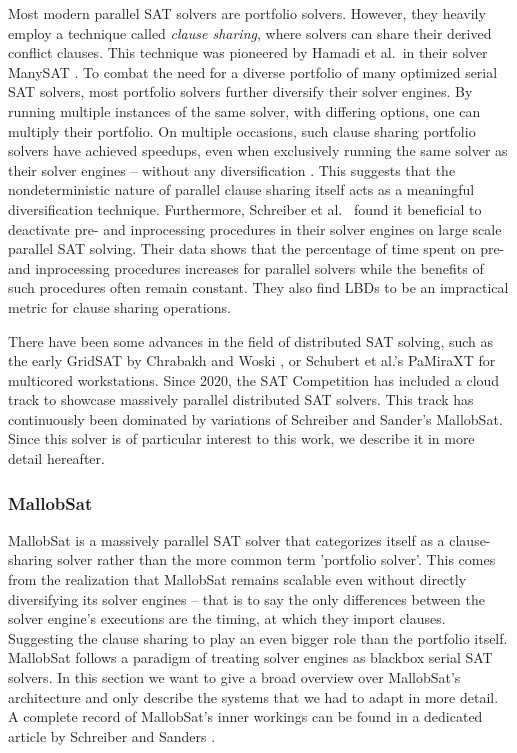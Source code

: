 \documentclass[12pt,a4paper,twoside]{scrartcl}
\numberwithin{equation}{section}
\begin{document}
Most modern parallel SAT solvers are portfolio solvers. However, they heavily employ a technique called \textit{clause sharing}, where solvers can share their derived conflict clauses. This technique was pioneered by Hamadi et al.~in their solver ManySAT \cite{manySAT}. To combat the need for a diverse portfolio of many optimized serial SAT solvers, most portfolio solvers further diversify their solver engines. By running multiple instances of the same solver, with differing options, one can multiply their portfolio. On multiple occasions, such clause sharing portfolio solvers have achieved speedups, even when exclusively running the same solver as their solver engines -- without any diversification \cite{mallobSat, gimsatul}. This suggests that the nondeterministic nature of parallel clause sharing itself acts as a meaningful diversification technique.
Furthermore, Schreiber et al.~\cite{searchOnlyPaper} found it beneficial to deactivate pre- and inprocessing procedures in their solver engines on large scale parallel SAT solving. Their data shows that the percentage of time spent on pre- and inprocessing procedures increases for parallel solvers while the benefits of such procedures often remain constant. They also find LBDs to be an impractical metric for clause sharing operations.

There have been some advances in the field of distributed SAT solving, such as the early GridSAT by Chrabakh and Woski \cite{chrabakh2003gridsat}, or Schubert et al.'s PaMiraXT \cite{schubert2010pamiraxt} for multicored workstations. Since 2020, the SAT Competition has included a cloud track to showcase massively parallel distributed SAT solvers. This track has continuously been dominated by variations of Schreiber and Sander's MallobSat. Since this solver is of particular interest to this work, we describe it in more detail hereafter.

\subsubsection{MallobSat}

MallobSat \cite{mallobSat} is a massively parallel SAT solver that categorizes itself as a clause-sharing solver rather than the more common term 'portfolio solver'. This comes from the realization that MallobSat remains scalable even without directly diversifying its solver engines -- that is to say the only differences between the solver engine's executions are the timing, at which they import clauses. Suggesting the clause sharing to play an even bigger role than the portfolio itself. MallobSat follows a paradigm of treating solver engines as blackbox serial SAT solvers. In this section we want to give a broad overview over MallobSat's architecture and only describe the systems that we had to adapt in more detail. A complete record of MallobSat's inner workings can be found in a dedicated article by Schreiber and Sanders \cite{mallobSat}.
\end{document}
